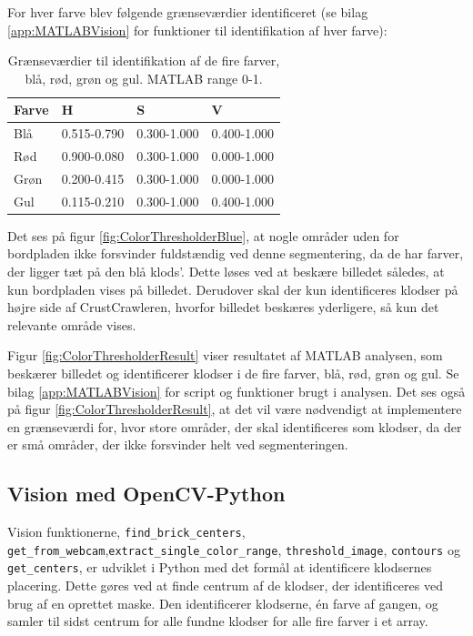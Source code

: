 
For hver farve blev følgende grænseværdier identificeret (se bilag \vref{app:MATLABVision} for funktioner til identifikation af hver farve):
\begin{table}[H]
\centering
\begin{tabular}{l|l|l|l}
Farve	&	H			&	S			&	V\\
\hline
Blå		&	0.515-0.790	&	0.300-1.000	&	0.400-1.000\\
Rød		&	0.900-0.080	&	0.300-1.000	&	0.000-1.000\\
Grøn	&	0.200-0.415	&	0.300-1.000	&	0.000-1.000\\
Gul		&	0.115-0.210	&	0.300-1.000	&	0.400-1.000\\
\end{tabular}	
\caption{Grænseværdier til identifikation af de fire farver, blå, rød, grøn og gul. MATLAB range 0-1.}
\end{table}

Det ses på figur \vref{fig:ColorThresholderBlue}, at nogle områder uden for bordpladen ikke forsvinder fuldstændig ved denne segmentering, da de har farver, der ligger tæt på den blå klods'.
Dette løses ved at beskære billedet således, at kun bordpladen vises på billedet.
Derudover skal der kun identificeres klodser på højre side af CrustCrawleren, hvorfor billedet beskæres yderligere, så kun det relevante område vises.

Figur \vref{fig:ColorThresholderResult} viser resultatet af MATLAB analysen, som beskærer billedet og identificerer klodser i de fire farver, blå, rød, grøn og gul.
Se bilag \vref{app:MATLABVision} for script og funktioner brugt i analysen.
Det ses også på figur \ref{fig:ColorThresholderResult}, at det vil være nødvendigt at implementere en grænseværdi for, hvor store områder, der skal identificeres som klodser, da der er små områder, der ikke forsvinder helt ved segmenteringen.


\newpage
\subsection{Vision med OpenCV-Python}
Vision funktionerne, \texttt{find\_brick\_centers}, \texttt{get\_from\_webcam},\newline \texttt{extract\_single\_color\_range}, \texttt{threshold\_image}, \texttt{contours} og \texttt{get\_centers}, er udviklet i Python med det formål at identificere klodsernes placering.
Dette gøres ved at finde centrum af de klodser, der identificeres ved brug af en oprettet maske.
Den identificerer klodserne, én farve af gangen, og samler til sidst centrum for alle fundne klodser for alle fire farver i et array.

